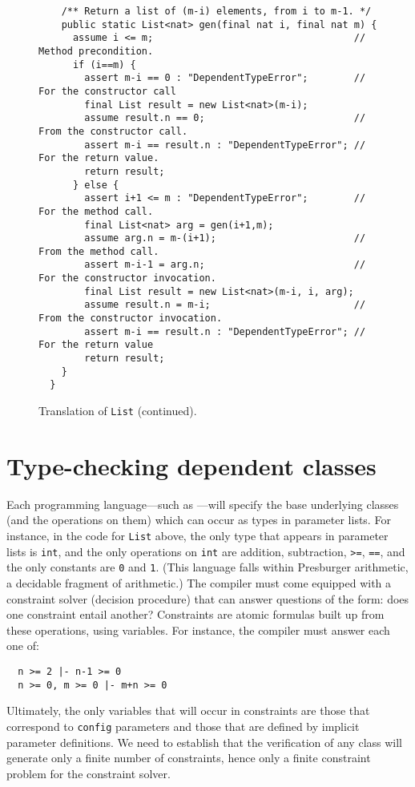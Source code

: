 \begin{figure*}
{\begin{verbatim}
    /** Return a list of (m-i) elements, from i to m-1. */
    public static List<nat> gen(final nat i, final nat m) {
      assume i <= m;                                   // Method precondition.
      if (i==m) {
        assert m-i == 0 : "DependentTypeError";        // For the constructor call
        final List result = new List<nat>(m-i);
        assume result.n == 0;                          // From the constructor call.
        assert m-i == result.n : "DependentTypeError"; // For the return value.
        return result;
      } else {
        assert i+1 <= m : "DependentTypeError";        // For the method call.
        final List<nat> arg = gen(i+1,m);
        assume arg.n = m-(i+1);                        // From the method call.
        assert m-i-1 = arg.n;                          // For the constructor invocation.
        final List result = new List<nat>(m-i, i, arg);
        assume result.n = m-i;                         // From the constructor invocation.
        assert m-i == result.n : "DependentTypeError"; // For the return value
        return result;
    }
  }
\end{verbatim}}
\caption{Translation of {\tt List} (continued).}\label{List-translation-2}
\end{figure*}

\section{Type-checking dependent classes}

Each programming language---such as \Xten{}---will specify the base
underlying classes (and the operations on them) which can occur as
types in parameter lists. For instance, in the code for {\tt List}
above, the only type that appears in parameter lists is {\tt int}, and
the only operations on {\tt int} are addition, subtraction, {\tt >=},
{\tt ==}, and the only constants are {\tt 0} and {\tt 1}.  (This
language falls within Presburger arithmetic, a decidable fragment of
arithmetic.)  The compiler must come equipped with a constraint solver
(decision procedure) that can answer questions of the form: does one
constraint entail another?  Constraints are atomic formulas built up
from these operations, using variables. For instance, the compiler
must answer each one of:
{\footnotesize
\begin{verbatim}
  n >= 2 |- n-1 >= 0
  n >= 0, m >= 0 |- m+n >= 0
\end{verbatim}}

Ultimately, the only variables that will occur in constraints are
those that correspond to {\tt config} parameters and those that are
defined by implicit parameter definitions. We need to establish that
the verification of any class will generate only a finite number of
constraints, hence only a finite constraint problem for the constraint
solver.

